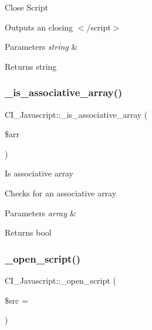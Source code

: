 Close Script

Outputs an closing $<$/script$>$


\begin{DoxyParams}{Parameters}
{\em string} & \\
\hline
\end{DoxyParams}
\begin{DoxyReturn}{Returns}
string 
\end{DoxyReturn}
\mbox{\label{class_c_i___javascript_a229c068a6bfb56eb1fad0e36602954b6}} 
\subsubsection{\texorpdfstring{\+\_\+is\+\_\+associative\+\_\+array()}{\_is\_associative\_array()}}
{\footnotesize\ttfamily C\+I\+\_\+\+Javascript\+::\+\_\+is\+\_\+associative\+\_\+array (\begin{DoxyParamCaption}\item[{}]{\$arr }\end{DoxyParamCaption})\hspace{0.3cm}{\ttfamily [protected]}}

Is associative array

Checks for an associative array


\begin{DoxyParams}{Parameters}
{\em array} & \\
\hline
\end{DoxyParams}
\begin{DoxyReturn}{Returns}
bool 
\end{DoxyReturn}
\mbox{\label{class_c_i___javascript_a394ba284502309b86ee279bb8e3e0b7d}} 
\subsubsection{\texorpdfstring{\+\_\+open\+\_\+script()}{\_open\_script()}}
{\footnotesize\ttfamily C\+I\+\_\+\+Javascript\+::\+\_\+open\+\_\+script (\begin{DoxyParamCaption}\item[{}]{\$src = {\ttfamily \textquotesingle{}\textquotesingle{}} }\end{DoxyParamCaption})\hspace{0.3cm}{\ttfamily [protected]}}

